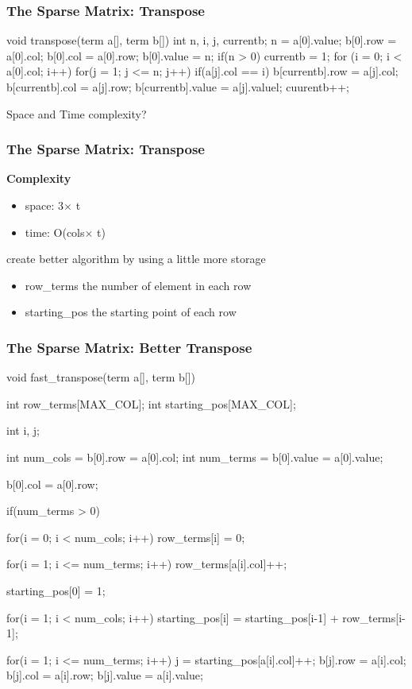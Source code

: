 \documentclass[newPxFont,sthlmFooter,nooffset]{beamer}
\begin{document}
\begin{frame}[t, fragile]
  \frametitle{The Sparse Matrix: Transpose}
\begin{codedef}
void transpose(term a[], term b[]) {
    int n, i, j, currentb;
    n = a[0].value; 
    b[0].row = a[0].col;
    b[0].col = a[0].row; 
    b[0].value = n;
    if(n > 0){
        currentb = 1;
        for (i = 0; i < a[0].col; i++)
            for(j = 1; j <= n; j++)
                if(a[j].col == i) {
                  b[currentb].row = a[j].col;  
                  b[currentb].col = a[j].row;  
                  b[currentb].value = a[j].valuel;  
                  cuurentb++;
            }
    }
}
\end{codedef}
Space and Time complexity?
\end{frame}

\begin{frame}[t, fragile]
  \frametitle{The Sparse Matrix: Transpose}
\textbf{Complexity}
\begin{itemize}
\item space: 3$\times$ t
\item time: O(cols$\times$ t)
\end{itemize}

create better algorithm by using a little more storage
\begin{itemize}
\item row\_terms the number of element in each row
\item starting\_pos the starting point of each row
\end{itemize}

\end{frame}

\begin{frame}
  \frametitle{The Sparse Matrix: Better Transpose}
\begin{codedef}
void fast_transpose(term a[], term b[]){
    int row_terms[MAX_COL];
    int starting_pos[MAX_COL];
    
    int i, j;
    
    int num_cols = b[0].row = a[0].col;
    int num_terms = b[0].value = a[0].value;

    b[0].col = a[0].row;

    if(num_terms > 0) {
        for(i = 0; i < num_cols; i++)
            row_terms[i] = 0;

        for(i = 1; i <= num_terms; i++)
            row_terms[a[i].col]++;

        starting_pos[0] = 1;

        for(i = 1; i < num_cols; i++)
            starting_pos[i] = starting_pos[i-1] + row_terms[i-1];

        for(i = 1; i <= num_terms; i++){
            j = starting_pos[a[i].col]++;
            b[j].row = a[i].col;
            b[j].col = a[i].row;
            b[j].value = a[i].value;
        }
    }
}  
\end{codedef}
\end{frame}
\end{document}
